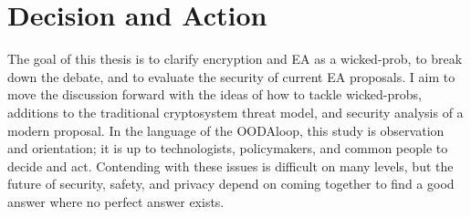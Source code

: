 \section{Decision and Action}

The goal of this thesis is to clarify encryption and \ac{EA} as a \ac{wicked-prob}, to break down the debate, and to
evaluate the security of current \ac{EA} proposals. I aim to move the discussion forward with the ideas of how to tackle
\acp{wicked-prob}, additions to the traditional cryptosystem threat model, and security analysis of a modern proposal.
In the language of the \ac{OODAloop}, this study is observation and orientation; it is up to technologists,
policymakers, and common people to decide and act. Contending with these issues is difficult on many levels, but the
future of security, safety, and privacy depend on coming together to find a good answer where no perfect answer exists.









